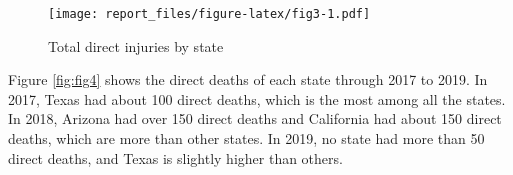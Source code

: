 \documentclass[
]{article}
\newenvironment{Shaded}{\begin{snugshade}}{\end{snugshade}}
\newcommand{\DataTypeTok}[1]{\textcolor[rgb]{0.13,0.29,0.53}{#1}}
\newcommand{\DecValTok}[1]{\textcolor[rgb]{0.00,0.00,0.81}{#1}}
\newcommand{\KeywordTok}[1]{\textcolor[rgb]{0.13,0.29,0.53}{\textbf{#1}}}
\newcommand{\NormalTok}[1]{#1}
\newcommand{\OperatorTok}[1]{\textcolor[rgb]{0.81,0.36,0.00}{\textbf{#1}}}
\newcommand{\OtherTok}[1]{\textcolor[rgb]{0.56,0.35,0.01}{#1}}
\newcommand{\StringTok}[1]{\textcolor[rgb]{0.31,0.60,0.02}{#1}}
\begin{document}
\begin{Shaded}
\end{Shaded}

\begin{figure}
\centering
\texttt{[image: report\_files/figure-latex/fig3-1.pdf]}
\caption{\label{fig:fig3}Total direct injuries by state}
\end{figure}

\clearpage

Figure \ref{fig:fig4} shows the direct deaths of each state through 2017 to 2019. In 2017, Texas had about 100 direct deaths, which is the most among all the states. In 2018, Arizona had over 150 direct deaths and California had about 150 direct deaths, which are more than other states. In 2019, no state had more than 50 direct deaths, and Texas is slightly higher than others.
\end{document}
